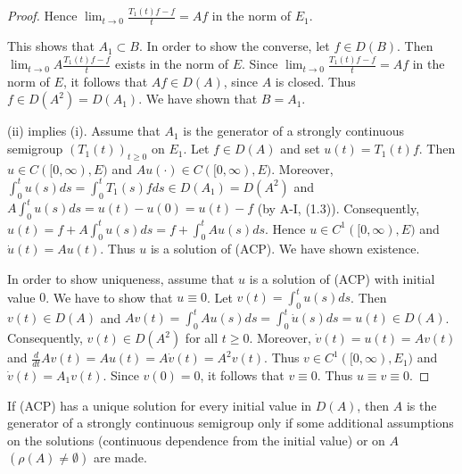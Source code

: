 \begin{proof}
Hence $\lim_{t \to 0} \frac{T_{1}(t)f - f}{t} = Af$ in the norm of $E_{1}$.

This shows that $A_{1} \subset B$.
In order to show the converse, let $f \in D(B)$.
Then $\lim_{t \to 0} A \frac{T_{1}(t)f - f}{t}$ exists in the norm of $E$.
Since $\lim_{t \to 0} \frac{T_{1}(t)f - f}{t} = Af$ in the norm of $E$, it follows that $Af \in D(A)$, since $A$ is closed.
Thus $f \in D(A^{2}) = D(A_{1})$.
We have shown that $B = A_{1}$.

(ii) implies (i).
Assume that $A_{1}$ is the generator of a strongly continuous semigroup $(T_{1}(t))_{t\geq0}$ on $E_{1}$.
Let $f \in D(A)$ and set $u(t) = T_{1}(t)f$.
Then $u \in C([0,\infty),E)$ and $Au(\cdot) \in C([0,\infty),E)$.
Moreover, $\int_{0}^{t} u(s)ds = \int_{0}^{t} T_{1}(s)fds \in D(A_{1}) = D(A^{2})$ and $A\int_{0}^{t} u(s)ds = u(t) - u(0) = u(t) - f$ (by A-I, (1.3)).
Consequently, $u(t) = f + A\int_{0}^{t} u(s)ds = f + \int_{0}^{t} Au(s)ds$.
Hence $u \in C^{1}([0,\infty),E)$ and $\dot{u}(t) = Au(t)$.
Thus $u$ is a solution of (ACP).
We have shown existence.


In order to show uniqueness, assume that $u$ is a solution of (ACP) with initial value $0$.
We have to show that $u \equiv 0$.
Let $v(t) = \int_{0}^{t} u(s)ds$.
Then $v(t) \in D(A)$ and $Av(t) = \int_{0}^{t} Au(s)ds = \int_{0}^{t} \dot{u}(s)ds = u(t) \in D(A)$.
Consequently, $v(t) \in D(A^{2})$ for all $t\geq0$.
Moreover, $\dot{v}(t) = u(t) = Av(t)$ and $\frac{d}{dt} Av(t) = Au(t) = A\dot{v}(t) = A^{2}v(t)$.
Thus $v \in C^{1}([0,\infty),E_{1})$ and $\dot{v}(t) = A_{1}v(t)$.
Since $v(0) = 0$, it follows that $v \equiv 0$.
Thus $u \equiv v \equiv 0$.
\end{proof}

If (ACP) has a unique solution for every initial value in $D(A)$, then $A$ is the generator of a strongly continuous semigroup only if some additional assumptions on the solutions (continuous dependence from the initial value) or on $A$ $(\rho(A) \neq \emptyset)$ are made.

